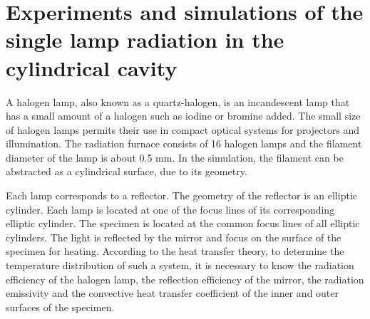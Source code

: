 \section{Experiments and simulations of the single lamp radiation in the cylindrical cavity}
\noindent
A halogen lamp, also known as a quartz-halogen, is an incandescent lamp that has a small amount of a halogen such as iodine or bromine added.
The small size of halogen lamps permits their use in compact optical systems for projectors and illumination.
The radiation furnace consists of 16 halogen lamps and the filament diameter of the lamp is about 0.5 mm. In the simulation, the filament can be abstracted as a cylindrical surface, due to its geometry.

Each lamp corresponds to a reflector. The geometry of the reflector is an elliptic cylinder. Each lamp is located at one of the focus
lines of its corresponding elliptic cylinder. The specimen is located at the common focus lines of all elliptic cylinders. The light is reflected by the mirror and focus on the surface of the specimen for heating.
According to the heat transfer theory, to determine the temperature distribution of such a system, it is necessary to know the radiation efficiency of the halogen lamp, the reflection efficiency of the mirror, the radiation emissivity and the convective heat transfer coefficient of the inner and outer surfaces of the specimen.

